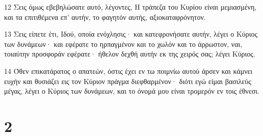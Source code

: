\par 12 Σεις όμως εβεβηλώσατε αυτό, λέγοντες, Η τράπεζα του Κυρίου είναι μεμιασμένη, και τα επιτιθέμενα επ' αυτήν, το φαγητόν αυτής, αξιοκαταφρόνητον.
\par 13 Σεις είπετε έτι, Ιδού, οποία ενόχλησις· και κατεφρονήσατε αυτήν, λέγει ο Κύριος των δυνάμεων· και εφέρατε το ηρπαγμένον και το χωλόν και το άρρωστον, ναι, τοιαύτην προσφοράν εφέρατε· ήθελον δεχθή αυτήν εκ της χειρός σας; λέγει Κύριος.
\par 14 Όθεν επικατάρατος ο απατεών, όστις έχει εν τω ποιμνίω αυτού άρσεν και κάμνει ευχήν και θυσιάζει εις τον Κύριον πράγμα διεφθαρμένον· διότι εγώ είμαι βασιλεύς μέγας, λέγει ο Κύριος των δυνάμεων, και το όνομά μου είναι τρομερόν εν τοις έθνεσι.

\chapter{2}

